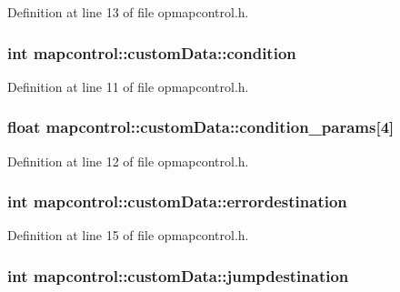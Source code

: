 \-Definition at line 13 of file opmapcontrol.\-h.

\hypertarget{structmapcontrol_1_1custom_data_a4bc59f4c1c8b0d292c6544d656ccd74a}{
\subsubsection[{condition}]{\setlength{\rightskip}{0pt plus 5cm}int {\bf mapcontrol\-::custom\-Data\-::condition}}}\label{structmapcontrol_1_1custom_data_a4bc59f4c1c8b0d292c6544d656ccd74a}


\-Definition at line 11 of file opmapcontrol.\-h.

\hypertarget{structmapcontrol_1_1custom_data_a9b6c6f2c6385e568668e7d821fcb5da7}{
\subsubsection[{condition\-\_\-params}]{\setlength{\rightskip}{0pt plus 5cm}float {\bf mapcontrol\-::custom\-Data\-::condition\-\_\-params}\mbox{[}4\mbox{]}}}\label{structmapcontrol_1_1custom_data_a9b6c6f2c6385e568668e7d821fcb5da7}


\-Definition at line 12 of file opmapcontrol.\-h.

\hypertarget{structmapcontrol_1_1custom_data_a065cac348b1f88fe39b41fd1d0f6fad4}{
\subsubsection[{errordestination}]{\setlength{\rightskip}{0pt plus 5cm}int {\bf mapcontrol\-::custom\-Data\-::errordestination}}}\label{structmapcontrol_1_1custom_data_a065cac348b1f88fe39b41fd1d0f6fad4}


\-Definition at line 15 of file opmapcontrol.\-h.

\hypertarget{structmapcontrol_1_1custom_data_a5e5179235bf8627c28c4c8b4ce0c8b84}{
\subsubsection[{jumpdestination}]{\setlength{\rightskip}{0pt plus 5cm}int {\bf mapcontrol\-::custom\-Data\-::jumpdestination}}}\label{structmapcontrol_1_1custom_data_a5e5179235bf8627c28c4c8b4ce0c8b84}


